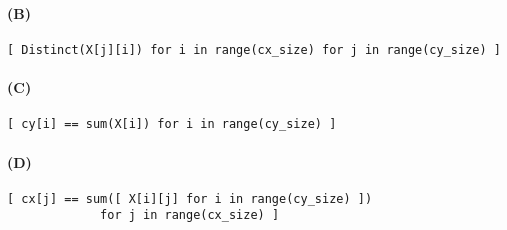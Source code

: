 \documentclass{article}
\begin{document}
\paragraph{(B)}
\begin{verbatim}
[ Distinct(X[j][i]) for i in range(cx_size) for j in range(cy_size) ]
\end{verbatim}
\paragraph{(C)}
\begin{verbatim}
[ cy[i] == sum(X[i]) for i in range(cy_size) ]
\end{verbatim}
\paragraph{(D)}
\begin{verbatim}
[ cx[j] == sum([ X[i][j] for i in range(cy_size) ])
             for j in range(cx_size) ]

\end{verbatim}
\end{document}
